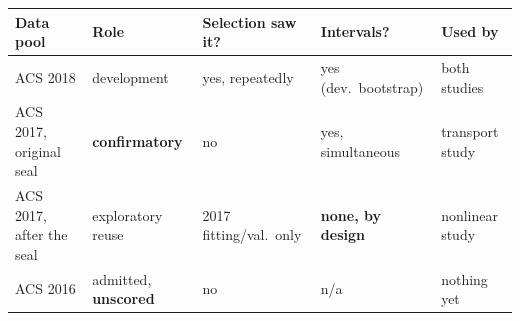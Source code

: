 \begin{tabular}{@{}lllll@{}}
\toprule
Data pool & Role & Selection saw it? & Intervals? & Used by \\
\midrule
ACS 2018 & development & yes, repeatedly & yes (dev.\ bootstrap) & both studies \\
ACS 2017, original seal & \textbf{confirmatory} & no & yes, simultaneous & transport study \\
ACS 2017, after the seal & exploratory reuse & 2017 fitting/val.\ only & \textbf{none, by design} & nonlinear study \\
ACS 2016 & admitted, \textbf{unscored} & no & n/a & nothing yet \\
\bottomrule
\end{tabular}
